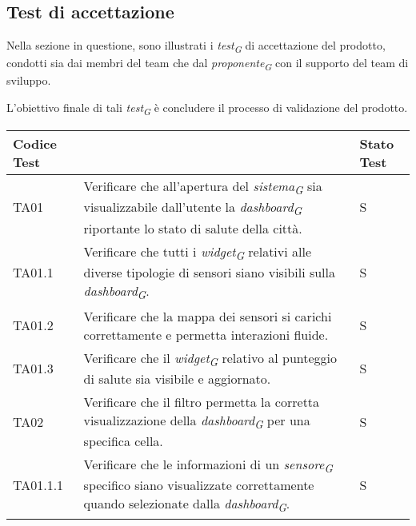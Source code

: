 \subsection{Test di accettazione}
Nella sezione in questione, sono illustrati i \textit{test}\textsubscript{\textit{G}} di accettazione del prodotto, condotti sia dai membri del team che dal \textit{proponente}\textsubscript{\textit{G}} con il supporto del team di sviluppo.

L'obiettivo finale di tali \textit{test}\textsubscript{\textit{G}} è concludere il processo di validazione del prodotto.

\vspace{0.4cm}

\begin{longtable}{|C{1.9cm}|L{7cm}|C{2cm}|}
    \hline
    \textbf{Codice Test} &  & \textbf{Stato Test} \\
    \hline \hline
    
    TA01 & Verificare che all'apertura del \textit{sistema}\textsubscript{\textit{G}} sia visualizzabile dall'utente la \textit{dashboard}\textsubscript{\textit{G}} riportante lo stato di salute della città. & S \\
    \hline
    
    TA01.1 & Verificare che tutti i \textit{widget}\textsubscript{\textit{G}} relativi alle diverse tipologie di sensori siano visibili sulla \textit{dashboard}\textsubscript{\textit{G}}. & S \\
    \hline
    
    TA01.2 & Verificare che la mappa dei sensori si carichi correttamente e permetta interazioni fluide. & S \\
    \hline
    
    TA01.3 & Verificare che il \textit{widget}\textsubscript{\textit{G}} relativo al punteggio di salute sia visibile e aggiornato. & S \\
    \hline
    
    TA02 & Verificare che il filtro permetta la corretta visualizzazione della \textit{dashboard}\textsubscript{\textit{G}} per una specifica cella. & S \\
    \hline
    
    TA01.1.1 & Verificare che le informazioni di un \textit{sensore}\textsubscript{\textit{G}} specifico siano visualizzate correttamente quando selezionate dalla \textit{dashboard}\textsubscript{\textit{G}}. & S \\
    \hline
    

\end{longtable}
